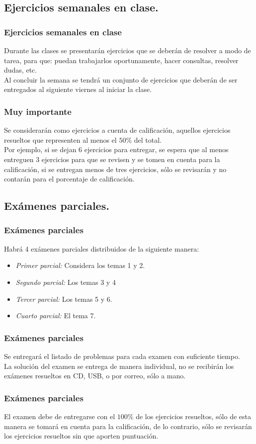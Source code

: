 \subsection{Ejercicios semanales en clase.}
\begin{frame}
\frametitle{Ejercicios semanales en clase}
Durante las clases se presentarán ejercicios que se deberán de resolver a modo de tarea, para que: puedan trabajarlos oportunamente, hacer consultas, resolver dudas, etc.
\\
\bigskip
\pause
Al concluir la semana se tendrá un conjunto de ejercicios que deberán de ser entregados al siguiente viernes al iniciar la clase.
\end{frame}
\begin{frame}
\frametitle{Muy importante}
Se considerarán como ejercicios a cuenta de calificación, aquellos ejercicios resueltos que representen al menos el $50\%$ del total.
\\
\bigskip
\pause
Por ejemplo, si se dejan 6 ejercicios para entregar, se espera que al menos entreguen 3 ejercicios para que se revisen y se tomen en cuenta para la calificación, si se entregan menos de tres ejercicios, sólo se revisarán y no contarán para el porcentaje de calificación.
\end{frame}
\subsection{Exámenes parciales.}
\begin{frame}
\frametitle{Exámenes parciales}
Habrá 4 exámenes parciales distribuidos de la siguiente manera:
\begin{itemize}
\item \emph{Primer parcial:} Considera los temas 1 y 2.
\item \emph{Segundo parcial:} Los temas 3 y 4
\item \emph{Tercer parcial:} Los temas 5 y 6.
\item \emph{Cuarto parcial:} El tema 7.
\end{itemize}
\end{frame}
\begin{frame}
\frametitle{Exámenes parciales}
Se entregará el listado de problemas para cada examen con suficiente tiempo.
\\
\bigskip
La solución del examen se entrega de manera individual, no se recibirán los exámenes resueltos en CD, USB, o por correo, sólo a mano.
\end{frame}
\begin{frame}
\frametitle{Exámenes parciales}
El examen debe de entregarse con el $100\%$ de los ejercicios resueltos, sólo de esta manera se tomará en cuenta para la calificación, de lo contrario, sólo se revisarán los ejercicios resueltos sin que aporten puntuación.
\end{frame}
